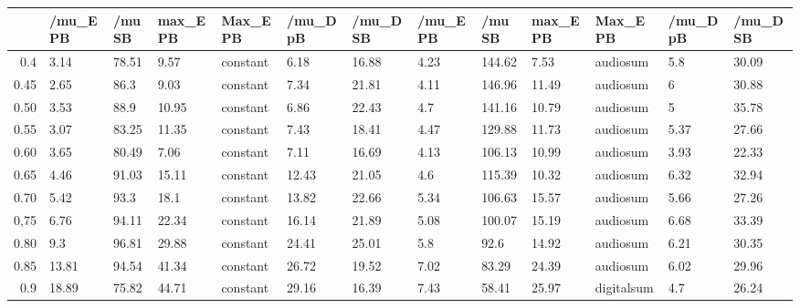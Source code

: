 \begin{table}[ht]
\centering
\begin{tabular}{rllllllllllll}
  \hline
 & /mu\_E PB & /mu SB & max\_E PB & Max\_E PB & /mu\_D pB & /mu\_D SB & /mu\_E PB & /mu SB & max\_E PB & Max\_E PB & /mu\_D pB & /mu\_D SB \\ 
  \hline
0.4 & 3.14 & 78.51 & 9.57 & constant & 6.18 & 16.88 & 4.23 & 144.62 & 7.53 & audiosum & 5.8 & 30.09 \\ 
  0.45 & 2.65 & 86.3 & 9.03 & constant & 7.34 & 21.81 & 4.11 & 146.96 & 11.49 & audiosum & 6 & 30.88 \\ 
  0.50 & 3.53 & 88.9 & 10.95 & constant & 6.86 & 22.43 & 4.7 & 141.16 & 10.79 & audiosum & 5 & 35.78 \\ 
  0.55 & 3.07 & 83.25 & 11.35 & constant & 7.43 & 18.41 & 4.47 & 129.88 & 11.73 & audiosum & 5.37 & 27.66 \\ 
  0.60 & 3.65 & 80.49 & 7.06 & constant & 7.11 & 16.69 & 4.13 & 106.13 & 10.99 & audiosum & 3.93 & 22.33 \\ 
  0.65 & 4.46 & 91.03 & 15.11 & constant & 12.43 & 21.05 & 4.6 & 115.39 & 10.32 & audiosum & 6.32 & 32.94 \\ 
  0.70 & 5.42 & 93.3 & 18.1 & constant & 13.82 & 22.66 & 5.34 & 106.63 & 15.57 & audiosum & 5.66 & 27.26 \\ 
  0,75 & 6.76 & 94.11 & 22.34 & constant & 16.14 & 21.89 & 5.08 & 100.07 & 15.19 & audiosum & 6.68 & 33.39 \\ 
  0.80 & 9.3 & 96.81 & 29.88 & constant & 24.41 & 25.01 & 5.8 & 92.6 & 14.92 & audiosum & 6.21 & 30.35 \\ 
  0.85 & 13.81 & 94.54 & 41.34 & constant & 26.72 & 19.52 & 7.02 & 83.29 & 24.39 & audiosum & 6.02 & 29.96 \\ 
  0.9 & 18.89 & 75.82 & 44.71 & constant & 29.16 & 16.39 & 7.43 & 58.41 & 25.97 & digitalsum & 4.7 & 26.24 \\ 
   \hline
\end{tabular}
\end{table}
